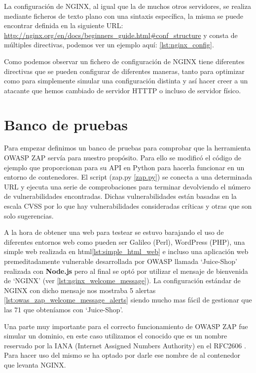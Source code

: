 \bigskip
La configuración de NGINX, al igual que la de muchos otros servidores, se realiza mediante ficheros de texto plano con una sintaxis específica, la misma se puede encontrar definida en la siguiente URL: \url{http://nginx.org/en/docs/beginners_guide.html#conf_structure} y consta de múltiples directivas, podemos ver un ejemplo aquí: \ref{lst:nginx_config}.

Como podemos observar un fichero de configuración de NGINX tiene diferentes directivas que se pueden configurar de diferentes maneras, tanto para optimizar como para simplemente simular una configuración distinta y así hacer creer a un atacante que hemos cambiado de servidor HTTTP o incluso de servidor físico.

\section{Banco de pruebas}

Para empezar definimos un banco de pruebas para comprobar que la herramienta OWASP ZAP servía para nuestro propósito. Para ello se modificó el código de ejemplo que proporcionan para su API en Python para hacerla funcionar en un entorno de contenedores. El script (zap.py \ref{zap.py}) se conecta a una determinada URL y ejecuta una serie de comprobaciones para terminar devolviendo el número de vulnerabilidades encontradas. Dichas vulnerabilidades están basadas en la escala CVSS por lo que hay vulnerabilidades consideradas críticas y otras que son solo sugerencias.

\bigskip
A la hora de obtener una web para testear se estuvo barajando el uso de diferentes entornos web como pueden ser Galileo (Perl), WordPress (PHP), una simple web realizada en html\ref{lst:simple_html_web} e incluso una aplicación web premeditadamente vulnerable desarrollada por OWASP llamada `Juice-Shop' realizada con \textbf{Node.js} pero al final se optó por utilizar el mensaje de bienvenida de `NGINX' (ver \ref{lst:nginx_welcome_message}). La configuración estándar de NGINX con dicho mensaje nos mostraba 5 alertas \ref{lst:owas_zap_welcome_message_alerts} siendo mucho mas fácil de gestionar que las 71 que obteníamos con `Juice-Shop'.

\bigskip
Una parte muy importante para el correcto funcionamiento de OWASP ZAP fue simular un dominio, en este caso utilizamos el conocido  que es un nombre reservado por la IANA (Internet Assigned Numbers Authority) en el RFC2606 \cite{eastlake_reserved_1999}. Para hacer uso del mismo se ha optado por darle ese nombre de  al contenedor que levanta NGINX.

